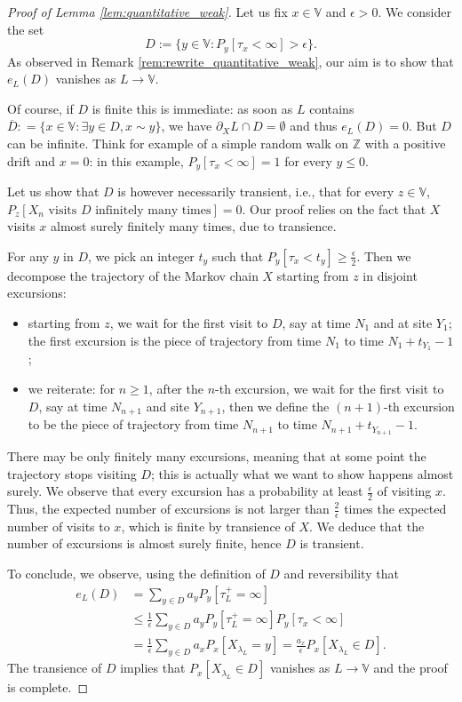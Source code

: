 \documentclass[12pt,a4paper]{article}
\newcommand{\1}[1]{{\mathbf 1}{\{#1\}}}
\newcommand{\8}{{\infty}}
\begin{document}
\begin{proof}[Proof of Lemma \ref{lem:quantitative_weak}] 
  Let us fix $x\in \mathbb{V}$ and $\epsilon >0$. We consider the set 
  \[D:=\{y \in \mathbb{V} : P_y[\tau_x<\infty]> \epsilon\}.\]
  As observed in Remark \ref{rem:rewrite_quantitative_weak}, our aim is to show that $e_L(D)$ vanishes as $L\to\mathbb{V}$.
  
  Of course, if $D$ is finite this is immediate: as soon as $L$ contains $\overline{D}: =\{x\in \mathbb{V}:\exists y \in D, x\sim y\}$, we have $\partial_X L \cap D =\emptyset$ and thus $e_L(D)=0$. But $D$ can be infinite. Think for example of a simple random walk on $\mathbb{Z}$ with a positive drift and $x=0$: in this example, $P_y[\tau_x<\infty]=1$ for every $y\le 0$.

  Let us show that $D$ is however necessarily transient, i.e., that for every $z\in \mathbb{V}$, 
  $P_z[X_n \text{ visits } D \text{ infinitely many times}]=0$. 
  Our proof relies on the fact that $X$ visits $x$ almost surely finitely many times, due to transience.

  For any $y$ in $D$, we pick an integer $t_y$ such that $P_y[\tau_x <t_y]\ge \frac{\epsilon}{2}$. Then we decompose the trajectory of the Markov chain $X$ starting from $z$ in disjoint excursions:
  \begin{itemize}
  \item starting from $z$, we wait for the first visit to $D$, say at time $N_1$ and at site $Y_1$; the first excursion is the piece of trajectory from time $N_1$ to time $N_1+t_{Y_1}-1$;
  \item we reiterate: for $n\ge 1$, after the $n$-th excursion, we wait for the first visit to $D$, say at time $N_{n+1}$ and site $Y_{n+1}$, then we define the $(n+1)$-th excursion to be the piece of trajectory from time $N_{n+1}$ to time $N_{n+1}+t_{Y_{n+1}}-1$. 
  \end{itemize}
  There may be only finitely many excursions, meaning that at some point the trajectory stops visiting $D$; this is actually what we want to show happens almost surely.
  We observe that every excursion has a probability at least $\frac{\epsilon}{2}$ of visiting $x$. Thus, the expected number of excursions is not larger than $\frac{2}{\epsilon}$ times the expected number of visits to $x$, which is finite by transience of $X$. We deduce that the number of excursions is almost surely finite, hence $D$ is transient.

  To conclude, we observe, using the definition of $D$ and reversibility that
  \begin{align*}
  e_L(D) & =    \sum_{y\in D} a_y P_y[\tau_L^+=\infty]\\
    & \le \frac{1}{\epsilon} \sum_{y\in D} a_y P_y[\tau_L^+=\infty]  P_y[\tau_x<\infty] \\
    & = \frac{1}{\epsilon} \sum_{y\in D} a_x P_x[X_{\lambda_L}=y]
     = \frac{a_x}{\epsilon} P_x[X_{\lambda_L}\in D].
  \end{align*}
  The transience of $D$ implies that $P_x[X_{\lambda_L}\in D]$ vanishes as $L\to\mathbb{V}$ and the proof is complete.
\end{proof}
  
\end{document}
